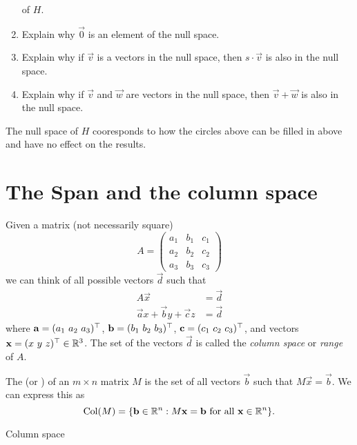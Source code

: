 \documentclass{ximera}
\begin{document}
\begin{example}
\begin{enumerate}
          of
          $H$.
    \item Explain why $\vec{0}$ is an element of the null space.
    \item Explain why if $\vec{v}$ is a vectors in the null space, then $s\cdot
            \vec{v}$ is also in the null space.
    \item Explain why if $\vec{v}$ and $\vec{w}$ are vectors in the null space,
          then $\vec{v} + \vec{w}$ is also in the null space.
  \end{enumerate}
  \begin{explanation}
    The null space of $H$ cooresponds to how the circles above can be filled in
    above and have no effect on the results.
  \end{explanation}
\end{example}

\section{The Span and the column space}

Given a matrix (not necessarily square)
\[
  A = \begin{pmatrix}
    a_1 & b_1 & c_1 \\
    a_2 & b_2 & c_2 \\
    a_3 & b_3 & c_3
  \end{pmatrix}
\]
we can think of all possible vectors $\vec{d}$ such that
\begin{align*}
  A\vec{x}                          & = \vec{d} \\
  \vec{a} x + \vec{b} y + \vec{c} z & = \vec{d}
\end{align*}
where $\mathbf{a} = (a_1~a_2~a_3)^\top$, $\mathbf{b} =
  (b_1~b_2~b_3)^\top$, $\mathbf{c} = (c_1~c_2~c_3)^\top$, and vectors
$\mathbf{x} = (x~y~z)^\top\in\mathbb{R}^3$.
The set of the vectors $\vec{d}$ is called the \textit{column space} or
\textit{range} of $A$.

\begin{definition}
  The  (or ) of an $m \times n$ matrix $M$ is
  the set of all vectors $\vec{b}$ such that $M\vec{x} = \vec{b}$. We can
  express
  this as
  \[
    \operatorname{Col}(M) = \{ \mathbf{b}\in\mathbb{R}^n: M\mathbf{x} = \mathbf{b}\text{~for
      all~}\mathbf{x}\in\mathbb{R}^n\}.
  \]
\end{definition}

\begin{example}
  Column space
\end{example}
\end{document}
